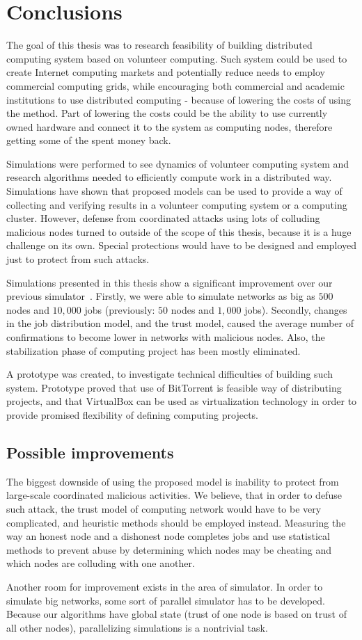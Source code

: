 \chapter{Conclusions}

The goal of this thesis was to research feasibility of building distributed computing system based on volunteer computing. Such system could be used to create Internet computing markets and potentially reduce needs to employ commercial computing grids, while encouraging both commercial and academic institutions to use distributed computing - because of lowering the costs of using the method. Part of lowering the costs could be the ability to use currently owned hardware and connect it to the system as computing nodes, therefore getting some of the spent money back.

Simulations were performed to see dynamics of volunteer computing system and research algorithms needed to efficiently compute work in a distributed way. Simulations have shown that proposed models can be used to provide a way of collecting and verifying results in a volunteer computing system or a computing cluster. However, defense from coordinated attacks using lots of colluding malicious nodes turned to outside of the scope of this thesis, because it is a huge challenge on its own. Special protections would have to be designed and employed just to protect from such attacks.

Simulations presented in this thesis show a significant improvement over our previous simulator~\cite{zochniakreliable}. Firstly, we were able to simulate networks as big as $500$ nodes and $10,000$ jobs (previously: $50$ nodes and $1,000$ jobs). Secondly, changes in the job distribution model, and the trust model, caused the average number of confirmations to become lower in networks with malicious nodes. Also, the stabilization phase of computing project has been mostly eliminated.

A prototype was created, to investigate technical difficulties of building such system. Prototype proved that use of BitTorrent is feasible way of distributing projects, and that VirtualBox can be used as virtualization technology in order to provide promised flexibility of defining computing projects. 

\section*{Possible improvements}

The biggest downside of using the proposed model is inability to protect from large-scale coordinated malicious activities. We believe, that in order to defuse such attack, the trust model of computing network would have to be very complicated, and heuristic methods should be employed instead. Measuring the way an honest node and a dishonest node completes jobs and use statistical methods to prevent abuse by determining which nodes may be cheating and which nodes are colluding with one another.

Another room for improvement exists in the area of simulator. In order to simulate big networks, some sort of parallel simulator has to be developed. Because our algorithms have global state (trust of one node is based on trust of all other nodes), parallelizing simulations is a nontrivial task.